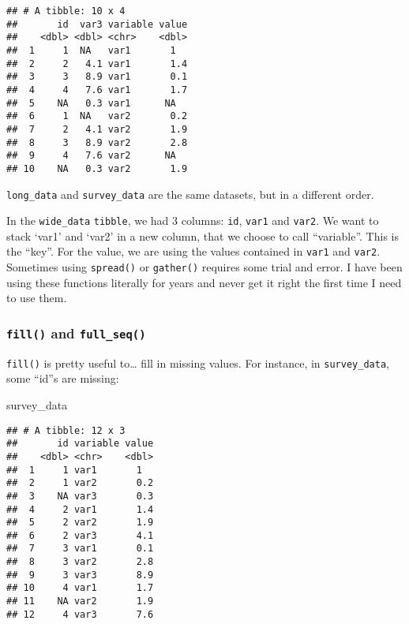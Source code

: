 \documentclass[
]{article}
\newenvironment{Shaded}{\begin{snugshade}}{\end{snugshade}}
\newcommand{\NormalTok}[1]{#1}
\begin{document}
\begin{verbatim}
## # A tibble: 10 x 4
##       id  var3 variable value
##    <dbl> <dbl> <chr>    <dbl>
##  1     1  NA   var1       1  
##  2     2   4.1 var1       1.4
##  3     3   8.9 var1       0.1
##  4     4   7.6 var1       1.7
##  5    NA   0.3 var1      NA  
##  6     1  NA   var2       0.2
##  7     2   4.1 var2       1.9
##  8     3   8.9 var2       2.8
##  9     4   7.6 var2      NA  
## 10    NA   0.3 var2       1.9
\end{verbatim}

\texttt{long\_data} and \texttt{survey\_data} are the same datasets, but in a different order.

In the \texttt{wide\_data} \texttt{tibble}, we had 3 columns: \texttt{id}, \texttt{var1} and \texttt{var2}. We want to stack `var1' and
`var2' in a new column, that we choose to call ``variable''. This is the ``key''. For the value, we are
using the values contained in \texttt{var1} and \texttt{var2}. Sometimes using \texttt{spread()} or \texttt{gather()} requires
some trial and error. I have been using these functions literally for years and never get it right
the first time I need to use them.

\hypertarget{fill-and-full_seq}{%
\subsubsection{\texorpdfstring{\texttt{fill()} and \texttt{full\_seq()}}{fill() and full\_seq()}}\label{fill-and-full_seq}}

\texttt{fill()} is pretty useful to\ldots{} fill in missing values. For instance, in \texttt{survey\_data}, some ``id''s
are missing:

\begin{Shaded}
\begin{Highlighting}[]
\NormalTok{survey\_data}
\end{Highlighting}
\end{Shaded}

\begin{verbatim}
## # A tibble: 12 x 3
##       id variable value
##    <dbl> <chr>    <dbl>
##  1     1 var1       1  
##  2     1 var2       0.2
##  3    NA var3       0.3
##  4     2 var1       1.4
##  5     2 var2       1.9
##  6     2 var3       4.1
##  7     3 var1       0.1
##  8     3 var2       2.8
##  9     3 var3       8.9
## 10     4 var1       1.7
## 11    NA var2       1.9
## 12     4 var3       7.6
\end{verbatim}
\end{document}
